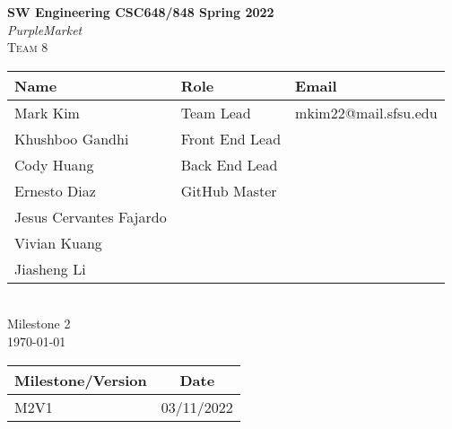 \begin{titlepage}
\begin{center}
	\vspace*{1cm}
	\LARGE
	\textbf{SW Engineering CSC648/848 Spring 2022}\\
	\textit{PurpleMarket}\\
	\textsc{Team 8}\\
	\vspace{5mm}
	\normalsize
	\begin{tabular}{ | l | l | l | }
	\hline
	Name & Role & Email\\\hline
	Mark Kim & Team Lead & mkim22@mail.sfsu.edu\\
	Khushboo Gandhi & Front End Lead &\\
	Cody Huang & Back End Lead &\\
	Ernesto Diaz & GitHub Master &\\
	Jesus Cervantes Fajardo & &\\
	Vivian Kuang & &\\
	Jiasheng Li & &\\\hline
	\end{tabular}
	\large\\
	\vspace{5mm}
	Milestone 2\\
	\today\\
	\vspace{1cm}
	\begin{tabular}{ | l | c | }
		\hline
		\textbf{Milestone/Version} & \textbf{Date}\\
		\hline
		M2V1 & 03/11/2022\\
		\hline
	\end{tabular}

\end{center}
\end{titlepage}